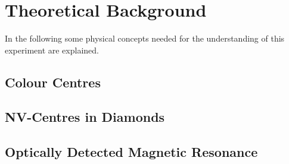\section{Theoretical Background}
In the following some physical concepts needed for the understanding of this experiment are explained.
\subsection{Colour Centres}


\subsection{NV-Centres in Diamonds}

\subsection{Optically Detected Magnetic Resonance}